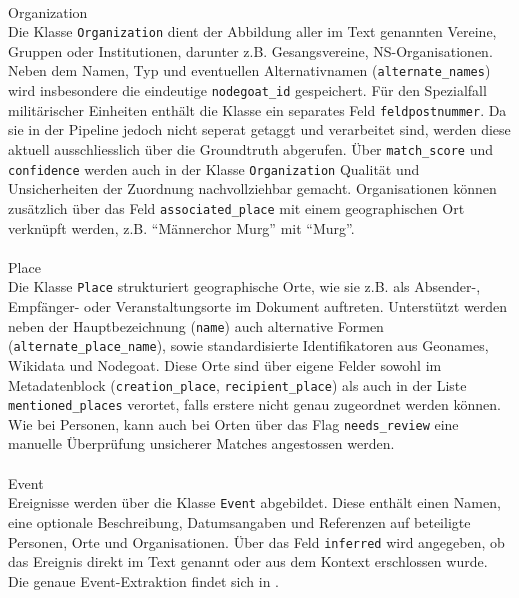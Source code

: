 \documentclass[12pt, a4paper, ngerman, bidi=default]{article}
\makeatletter
\newcommand{\code}[1]{\colorbox{VeryLightGray}{\texttt{#1}}} %
\let\oldparagraph\paragraph%
\renewcommand{\paragraph}{
    \@ifstar%
      \xxxParagraphStar%
      \xxxParagraphNoStar%
 }
\newcommand{\xxxParagraphStar}[1]{\oldparagraph*{#1}\mbox{}}
\newcommand{\xxxParagraphNoStar}[1]{\oldparagraph{#1}\mbox{}}
\makeatother
\begin{document}
\paragraph{Organization}\\
Die Klasse \code{Organization} dient der Abbildung aller im Text genannten Vereine, Gruppen oder Institutionen, 
darunter z.B. Gesangsvereine, NS-Organisationen. Neben dem Namen, Typ und eventuellen 
Alternativnamen (\code{alternate\_names}) wird insbesondere die eindeutige \code{nodegoat\_id} gespeichert. Für den Spezialfall 
militärischer Einheiten enthält die Klasse ein separates Feld \code{feldpostnummer}. Da sie in der Pipeline jedoch nicht seperat getaggt und verarbeitet sind,
werden diese aktuell ausschliesslich über die Groundtruth abgerufen. Über \code{match\_score} und \code{confidence} 
werden auch in der Klasse \code{Organization} Qualität und Unsicherheiten der Zuordnung nachvollziehbar gemacht. 
Organisationen können zusätzlich über das Feld \code{associated\_place} mit einem geographischen Ort verknüpft werden, z.B. \enquote{Männerchor Murg} mit \enquote{Murg}.

\paragraph{Place}\\
Die Klasse \code{Place} strukturiert geographische Orte, wie sie z.B. als Absender-, Empfänger- oder 
Veranstaltungsorte im Dokument auftreten. Unterstützt werden neben der Hauptbezeichnung (\code{name}) 
auch alternative Formen (\code{alternate\_place\_name}), sowie standardisierte Identifikatoren aus Geonames, 
Wikidata und Nodegoat. Diese Orte sind über eigene Felder sowohl im Metadatenblock (\code{creation\_place}, 
\code{recipient\_place}) als auch in der Liste \code{mentioned\_places} verortet, falls erstere nicht genau zugeordnet werden können. 
Wie bei Personen, kann auch bei Orten 
über das Flag \code{needs\_review} eine manuelle Überprüfung unsicherer Matches angestossen werden.

\paragraph{Event}\\
Ereignisse werden über die Klasse \code{Event} abgebildet. Diese enthält einen Namen, eine optionale Beschreibung, 
Datumsangaben und Referenzen auf beteiligte Personen, Orte und Organisationen. Über das Feld \code{inferred} wird angegeben, 
ob das Ereignis direkt im Text genannt oder aus dem Kontext erschlossen wurde. Die genaue Event-Extraktion findet sich 
in .
\end{document}
